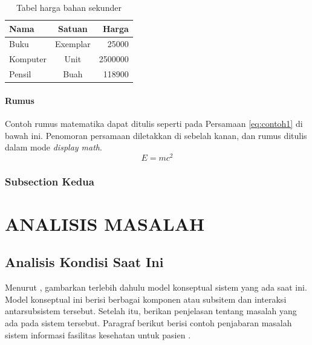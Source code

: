 \documentclass[12pt,a4paper,oneside]{book}
\begin{document}
\begin{table}[h] %
\centering
	\begin{tabular}{ | l | c | r | }
	\hline
	Nama 	& Satuan 		& Harga \\
	\hline
	Buku 	& Exemplar	& 25000 \\
	Komputer	& Unit		& 2500000 \\
	Pensil	& Buah		& 118900 \\
	\hline
	\end{tabular}
\caption{Tabel harga bahan sekunder}
\label{tbl:harga2}
\end{table}

\subsubsection{Rumus}
Contoh rumus matematika dapat ditulis seperti pada Persamaan \ref{eq:contoh1} di bawah ini. 
Penomoran persamaan diletakkan di sebelah kanan, dan rumus ditulis dalam mode \textit{display math}.
\begin{equation}
E = mc^2
\label{eq:contoh1}
\end{equation}

\subsection{Subsection Kedua}
\lipsum[3]

\chapter{ANALISIS MASALAH}
\section{Analisis Kondisi Saat Ini}
Menurut \textcite{BPPT2020}, gambarkan terlebih dahulu model konseptual sistem yang ada saat ini. Model konseptual ini berisi berbagai komponen atau subsitem dan interaksi antarsubsistem tersebut. Setelah itu, berikan penjelasan tentang masalah yang ada pada sistem tersebut. Paragraf berikut berisi contoh penjabaran masalah sistem informasi fasilitas kesehatan untuk pasien \autocite{Halkiopoulos2024}. 
\end{document}
